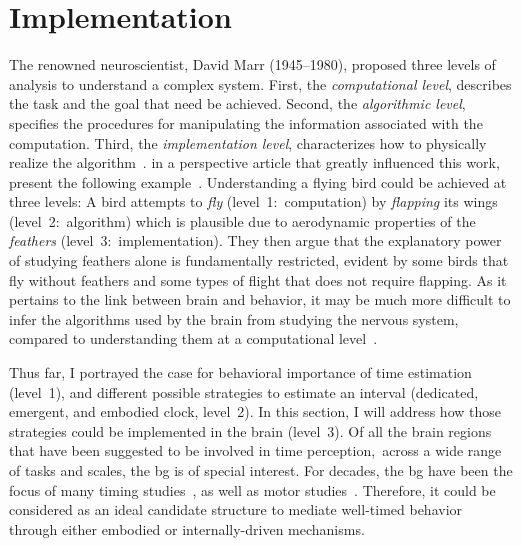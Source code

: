 \section{Implementation}
\label{ch:intro:implementation}

The renowned neuroscientist, David Marr (1945--1980), proposed three levels of analysis to understand a complex system.
First, the \emph{computational level}\!{}, describes the task and the goal that need be achieved.
Second, the \emph{algorithmic level}\!{}, specifies the procedures for manipulating the information associated with the computation.
Third, the \emph{implementation level}\!{}, characterizes how to physically realize the algorithm~\cite{Willshaw2015Marr}.
 in a perspective article that greatly influenced this work, present the following example~\cite{Krakauer2017Neuron}.
Understanding a flying bird could be achieved at three levels:
A bird attempts to \textit{fly} (level~1:~computation) by \textit{flapping} its wings (level~2:~algorithm) which is plausible due to aerodynamic properties of the \textit{feathers} (level~3:~implementation).
They then argue that the explanatory power of studying feathers alone is fundamentally restricted, evident by some birds that fly without feathers and some types of flight that does not require flapping.
As it pertains to the link between brain and behavior, it may be much more difficult to infer the algorithms used by the brain from studying the nervous system, compared to understanding them at a computational level~\cite[see also][]{Jonas2017}.
\par
Thus far, I portrayed the case for behavioral importance of time estimation (level~1), and different possible strategies to estimate an interval (dedicated, emergent, and embodied clock, level~2).
In this section, I will address how those strategies could be implemented in the brain (level~3).
Of all the brain regions that have been suggested to be involved in time perception,\footnotemark\ across a wide range of tasks and scales, the \gls{bg} is of special interest.
For decades, the \gls{bg} have been the focus of many timing studies~\cite[see][]{Paton2018NeuronRev}, as well as motor studies~\cite[see][]{Turner2010CurrOpinNeurobiol}.
Therefore, it could be considered as an ideal candidate structure to mediate well-timed behavior through either embodied or internally-driven mechanisms.

